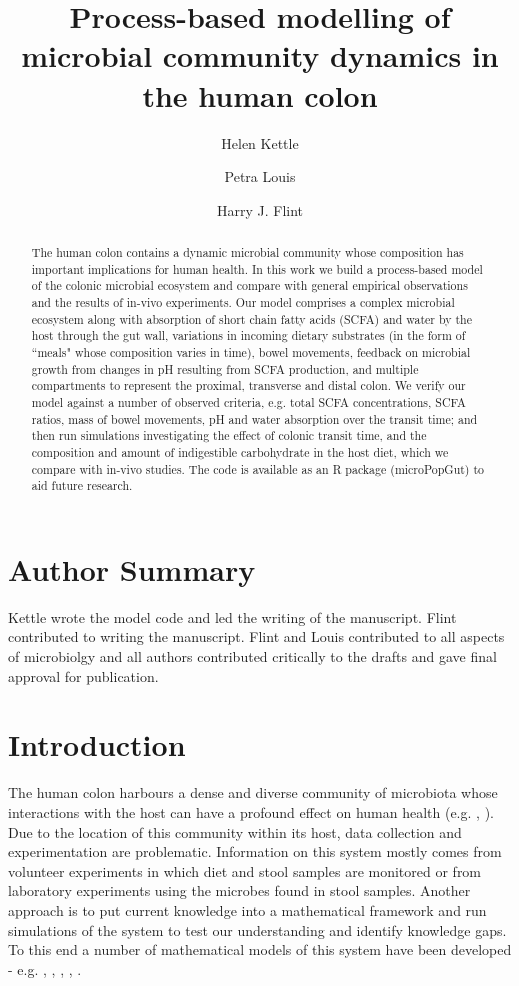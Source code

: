 \documentclass[a4paper]{article}
\title{Process-based modelling of microbial community dynamics in the human colon}
\author[1,*]{Helen Kettle}
\author[2]{Petra Louis}
\author[2]{Harry J. Flint}
\affil[1]{Biomathematics and Statistics Scotland, James Clerk Maxwell Building, Peter Guthrie Tait Road, Edinburgh, EH9 3FD}
\affil[2]{Gut Health Group, Rowett Institute, University of Aberdeen, Aberdeen, UK}
\affil[*]{Corresponding author: Helen.Kettle@bioss.ac.uk}
\begin{document}
\maketitle

\linenumbers


\begin{abstract}
The human colon contains a dynamic microbial community whose composition has important implications for human health. In this work we build a process-based model of the colonic microbial ecosystem and compare with general empirical observations and the results of in-vivo experiments.   
Our model comprises a complex microbial ecosystem along with absorption of short chain fatty acids (SCFA) and water by the host through the gut wall, variations in incoming dietary substrates (in the form of ``meals" whose composition varies in time), bowel movements, feedback on microbial growth from changes in pH resulting from SCFA production, and multiple compartments to represent the proximal, transverse and distal colon. 
We verify our model against a number of observed criteria, e.g. total SCFA concentrations, SCFA ratios, mass of bowel movements, pH and water absorption over the transit time; and then run simulations investigating the effect of colonic transit time, and the composition and amount of indigestible carbohydrate in the host diet, which we compare with in-vivo studies.
The code is available as an R package (microPopGut) to aid future research.
\end{abstract}

\section*{Author Summary}
Kettle wrote the model code and led the writing of the manuscript. Flint contributed to writing the manuscript. Flint and Louis contributed to all aspects of microbiolgy and all authors contributed critically to the drafts and gave final approval for publication.

\section*{Introduction}
The human colon harbours a dense and diverse community of microbiota whose interactions with the host can have a profound effect on human health (e.g. \cite{health1}, \cite{morrison2016}). Due to the location of this community within its host, data collection and experimentation are problematic. Information on this system mostly comes from volunteer experiments in which diet and stool samples are monitored or from laboratory experiments using the microbes found in stool samples. Another approach is to put current knowledge into a mathematical framework and run simulations of the system to test our understanding and identify knowledge gaps. To this end a number of mathematical models of this system have been developed - e.g. 
\cite{Cremer16}, \cite{Cremer17}, \cite{Munoz}, \cite{smith}, \cite{moorthy}.
\end{document}
